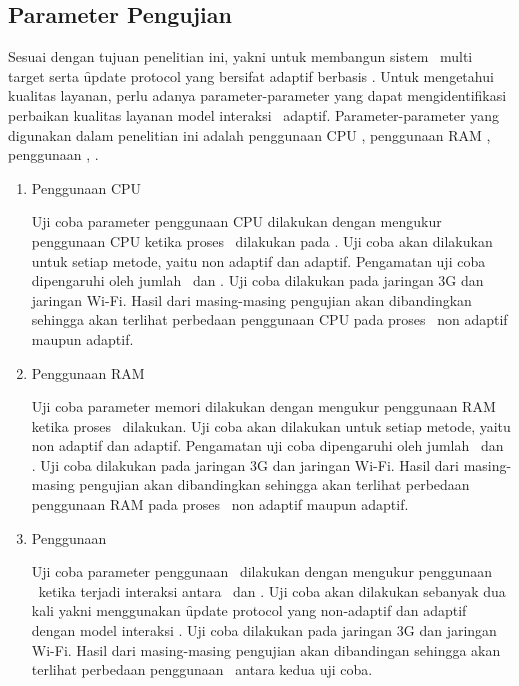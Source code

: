 
\subsection{Parameter Pengujian}

Sesuai dengan tujuan penelitian ini, yakni untuk membangun sistem
\tracking~multi target serta \f{update protocol} yang bersifat adaptif berbasis
\pubsub. Untuk mengetahui kualitas layanan, perlu adanya parameter-parameter
yang dapat mengidentifikasi perbaikan kualitas layanan model interaksi
\pubsub~adaptif.  Parameter-parameter yang digunakan dalam penelitian ini adalah
penggunaan CPU \server, penggunaan RAM \server, penggunaan \bandwidth, \latency.

\begin{enumerate}
  [label=\alph*.
  ,noitemsep
  ,nolistsep
  ,leftmargin=0cm
  ,itemindent=.5cm
  ,listparindent=\parindent
  ]

	\item Penggunaan CPU \Server

	Uji coba parameter penggunaan CPU dilakukan dengan mengukur penggunaan CPU
	ketika proses \tracking~dilakukan pada \broker. Uji coba akan dilakukan
	untuk setiap metode, yaitu non adaptif dan adaptif. Pengamatan uji coba
	dipengaruhi oleh jumlah \publisher~dan \subscriber. Uji coba dilakukan pada
  jaringan 3G dan jaringan Wi-Fi. Hasil dari masing-masing
	pengujian akan dibandingkan sehingga akan terlihat perbedaan penggunaan CPU
	pada proses \tracking~non adaptif maupun adaptif.

	\item Penggunaan RAM \Server

	Uji coba parameter memori dilakukan dengan mengukur penggunaan RAM ketika
	proses \tracking~dilakukan. Uji coba akan dilakukan untuk setiap metode, yaitu
	non adaptif dan adaptif. Pengamatan uji coba dipengaruhi oleh jumlah
	\publisher~dan \subscriber. Uji coba dilakukan pada jaringan 3G dan jaringan
  Wi-Fi. Hasil dari masing-masing pengujian akan
	dibandingkan sehingga akan terlihat perbedaan penggunaan RAM pada proses
	\tracking~non adaptif maupun adaptif.

	\item Penggunaan \bandwidth{}

  Uji coba parameter penggunaan \bandwidth~dilakukan dengan mengukur penggunaan
  \bandwidth~ketika terjadi interaksi antara \server~dan \client. Uji coba akan
  dilakukan sebanyak dua kali yakni menggunakan \f{update protocol} yang
  non-adaptif dan adaptif dengan model interaksi \pubsub. Uji coba dilakukan
  pada jaringan 3G dan jaringan Wi-Fi. Hasil dari
  masing-masing pengujian akan dibandingan sehingga akan terlihat perbedaan
  penggunaan \bandwidth~antara kedua uji coba.


\end{enumerate}
